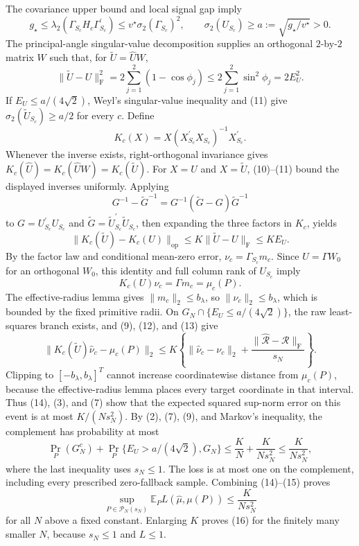 The covariance upper bound and local signal gap imply
\[
g_\star
\le\lambda_2(\Gamma_{S_c}H_c\Gamma_{S_c}^{\prime})
\le v^\star\sigma_2(\Gamma_{S_c})^2,
\qquad
\sigma_2(U_{S_c})\ge a:=\sqrt{g_\star/v^\star}>0.
\tag{10}
\]
The principal-angle singular-value decomposition supplies an orthogonal \(2\)-by-\(2\) matrix \(W\) such that, for \(\widetilde U=\widehat UW\),
\[
\|\widetilde U-U\|_{\mathrm F}^2
=2\sum_{j=1}^2(1-\cos\phi_j)
\le2\sum_{j=1}^2\sin^2\phi_j
=2E_U^2.
\tag{11}
\]
If \(E_U\le a/(4\sqrt2)\), Weyl's singular-value inequality and (11) give
\(\sigma_2(\widetilde U_{S_c})\ge a/2\) for every \(c\).  Define
\[
K_c(X)=X(X_{S_c}^{\prime}X_{S_c})^{-1}X_{S_c}^{\prime}.
\]
Whenever the inverse exists, right-orthogonal invariance gives
\(K_c(\widehat U)=K_c(\widehat UW)=K_c(\widetilde U)\).
For \(X=U\) and \(X=\widetilde U\), (10)--(11) bound the displayed inverses uniformly.  Applying
\[
G^{-1}-\widetilde G^{-1}=G^{-1}(\widetilde G-G)\widetilde G^{-1}
\]
to \(G=U_{S_c}^{\prime}U_{S_c}\) and
\(\widetilde G=\widetilde U_{S_c}^{\prime}\widetilde U_{S_c}\), then expanding the three factors in \(K_c\), yields
\[
\|K_c(\widetilde U)-K_c(U)\|_{\mathrm{op}}
\le K\|\widetilde U-U\|_{\mathrm F}
\le K E_U.
\tag{12}
\]
By the factor law and conditional mean-zero error,
\(\nu_c=\Gamma_{S_c}m_c\).  Since \(U=\Gamma W_0\) for an orthogonal \(W_0\), this identity and full column rank of \(U_{S_c}\) imply
\[
K_c(U)\nu_c=\Gamma m_c=\mu_c(P).
\tag{13}
\]
The effective-radius lemma gives \(\|m_c\|_2\le b_\lambda\), so \(\|\nu_c\|_2\le b_\lambda\), which is bounded by the fixed primitive radii.  On \(G_N\cap\{E_U\le a/(4\sqrt2)\}\), the raw least-squares branch exists, and (9), (12), and (13) give
\[
\|K_c(\widetilde U)\widehat\nu_c-\mu_c(P)\|_2
\le K\left\{
\|\widehat\nu_c-\nu_c\|_2
+\frac{\|\widehat{\mathcal R}-\mathcal R\|_{\mathrm F}}{s_N}
\right\}.
\tag{14}
\]
Clipping to \([-b_\lambda,b_\lambda]^T\) cannot increase coordinatewise distance from \(\mu_c(P)\), because the effective-radius lemma places every target coordinate in that interval.  Thus (14), (3), and (7) show that the expected squared sup-norm error on this event is at most \(K/(Ns_N^2)\).  By (2), (7), (9), and Markov's inequality, the complement has probability at most
\[
\Pr_P(G_N^c)
+\Pr_P\{E_U>a/(4\sqrt2),G_N\}
\le\frac K N+\frac{K}{Ns_N^2}
\le\frac{K}{Ns_N^2},
\tag{15}
\]
where the last inequality uses \(s_N\le1\).  The loss is at most one on the complement, including every prescribed zero-fallback sample.  Combining (14)--(15) proves
\[
\sup_{P\in\mathcal P_N(s_N)}
\mathbb E_PL(\widehat\mu,\mu(P))
\le\frac{K}{Ns_N^2}
\tag{16}
\]
for all \(N\) above a fixed constant.  Enlarging \(K\) proves (16) for the finitely many smaller \(N\), because \(s_N\le1\) and \(L\le1\).

